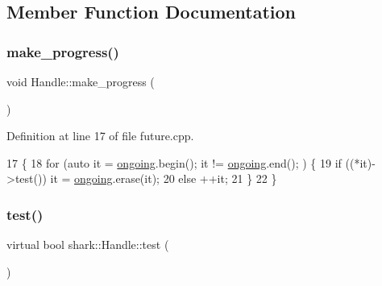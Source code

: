 \subsection{Member Function Documentation}
\hypertarget{classshark_1_1_handle_a2c999eeeb8dd6283b9b792515a10e6aa}{}\label{classshark_1_1_handle_a2c999eeeb8dd6283b9b792515a10e6aa} 
\subsubsection{\texorpdfstring{make\+\_\+progress()}{make\_progress()}}
{\footnotesize\ttfamily void Handle\+::make\+\_\+progress (\begin{DoxyParamCaption}{ }\end{DoxyParamCaption})\hspace{0.3cm}{\ttfamily [static]}}



Definition at line 17 of file future.\+cpp.


\begin{DoxyCode}
17                            \{
18     \textcolor{keywordflow}{for} (\textcolor{keyword}{auto} it = \hyperlink{classshark_1_1_handle_a0ade8d8ad19d5620c10381a7e26db838}{ongoing}.begin(); it != \hyperlink{classshark_1_1_handle_a0ade8d8ad19d5620c10381a7e26db838}{ongoing}.end(); ) \{
19         \textcolor{keywordflow}{if} ((*it)->test()) it = \hyperlink{classshark_1_1_handle_a0ade8d8ad19d5620c10381a7e26db838}{ongoing}.erase(it);
20         \textcolor{keywordflow}{else} ++it;
21     \}
22 \}
\end{DoxyCode}
\hypertarget{classshark_1_1_handle_a79ac46bc643e22c2a1fb28d45634fa68}{}\label{classshark_1_1_handle_a79ac46bc643e22c2a1fb28d45634fa68} 
\subsubsection{\texorpdfstring{test()}{test()}}
{\footnotesize\ttfamily virtual bool shark\+::\+Handle\+::test (\begin{DoxyParamCaption}{ }\end{DoxyParamCaption})\hspace{0.3cm}{\ttfamily [pure virtual]}}



